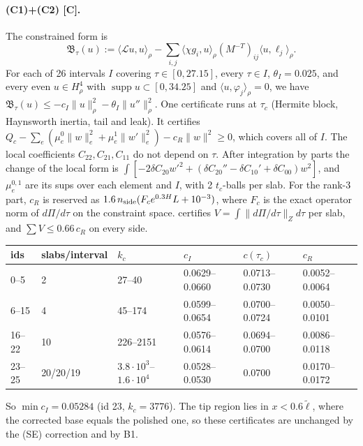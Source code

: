 \documentclass[11pt]{article}
\theoremstyle{definition}
\theoremstyle{remark}
\newcommand{\fn}[1]{\texttt{\detokenize{#1}}}
\newcommand{\tC}{\textnormal{\textsc{[C]}}}
\newcommand{\ip}[2]{\langle #1,#2\rangle}
\newcommand{\norm}[1]{\lVert #1\rVert}
\newcommand{\lt}{\tilde\ell}
\newcommand{\cL}{\mathcal L}
\newcommand{\cB}{\mathfrak B}
\begin{document}
\paragraph{(C1)+(C2) \tC.} The constrained form is
\[
\cB_\tau(u):=\ip{\cL u}u_\rho-\sum_{i,j}\ip{\chi g_i}u_\rho(M^{-T})_{ij}\ip u{\ell_j}_\rho .
\]
For each of 26 intervals $I$ covering $\tau\in[0,27.15]$, every $\tau\in I$, $\theta_I=0.025$, and every even $u\in H^4_\rho$ with $\operatorname{supp}u\subset[0,34.25]$ and $\ip u{\varphi_j}_\rho=0$, we have $\cB_\tau(u)\le-c_I\norm u_\rho^2-\theta_I\norm{u''}_\rho^2$. One certificate runs at $\tau_c$ (Hermite block, Haynsworth inertia, tail and leak). It certifies $Q_c-\sum_e(\mu^0_e\norm w_e^2+\mu^1_e\norm{w'}_e^2)-c_R\norm w^2\ge0$, which covers all of $I$. The local coefficients $C_{22},C_{21},C_{11}$ do not depend on $\tau$. After integration by parts the change of the local form is $\int[-2\delta C_{20}w'^2+(\delta C_{20}''-\delta C_{10}'+\delta C_{00})w^2]$, and $\mu^{0,1}_e$ are its sups over each element and $I$, with 2 $t_c$-balls per slab. For the rank-3 part, $c_R$ is reserved as $1.6\,n_{\rm side}(F_ce^{0.3H}L+10^{-3})$, where $F_c$ is the exact operator norm of $d\Pi/d\tau$ on the constraint space. \fn{c2r3.py} certifies $V=\int\norm{d\Pi/d\tau}_Zd\tau$ per slab, and $\sum V\le0.66\,c_R$ on every side.
\begin{center}\small\begin{tabular}{@{}llllll@{}}\toprule
ids & slabs/interval & $k_c$ & $c_I$ & $c(\tau_c)$ & $c_R$\\\midrule
0--5 & 2 & 27--40 & 0.0629--0.0660 & 0.0713--0.0730 & 0.0052--0.0064\\
6--15 & 4 & 45--174 & 0.0599--0.0654 & 0.0700--0.0724 & 0.0050--0.0101\\
16--22 & 10 & 226--2151 & 0.0576--0.0614 & 0.0694--0.0700 & 0.0086--0.0118\\
23--25 & 20/20/19 & $3.8\cdot10^3$--$1.6\cdot10^4$ & 0.0528--0.0530 & 0.0700 & 0.0170--0.0172\\\bottomrule\end{tabular}\end{center}
So $\min c_I=0.05284$ (id 23, $k_c=3776$). The tip region lies in $x<0.6\lt$, where the corrected base equals the polished one, so these certificates are unchanged by the (SE) correction and by B1.
\end{document}
